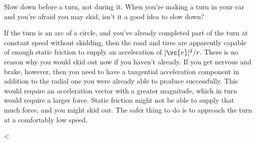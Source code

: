 \begin{eg}{Slow down before a turn, not during it.}
\egquestion When you're making a turn in your car and you're
afraid you may skid, isn't  it a good idea to slow down?

\eganswer If the turn is an arc of a circle, and you've
already completed part of the turn at constant speed without
skidding, then the road and tires are apparently capable of
enough static friction to supply an acceleration of
$|\vc{v}|^2/r$. There is no reason why you would skid out now if
you haven't already. If you get nervous and brake, however,
then you need to have a tangential acceleration component in
addition to the radial one you were already able to
produce successfully. This would require an acceleration
vector with a greater magnitude, which in turn would require
a larger force. Static friction might not be able to supply
that much force, and you might skid out. The safer thing to do is to
approach the turn at a comfortably low speed.
\end{eg}

\enlargethispage{\baselineskip}



<%

\begin{vocab}





\end{vocab}

\begin{notation}


\end{notation}

